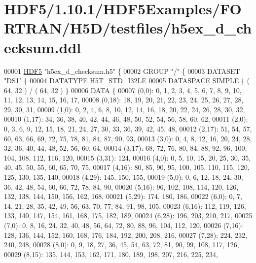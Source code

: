\hypertarget{_h_d_f5_21_810_81_2_h_d_f5_examples_2_f_o_r_t_r_a_n_2_h5_d_2testfiles_2h5ex__d__checksum_8ddl_source}{}\section{H\+D\+F5/1.10.1/\+H\+D\+F5\+Examples/\+F\+O\+R\+T\+R\+A\+N/\+H5\+D/testfiles/h5ex\+\_\+d\+\_\+checksum.ddl}
\label{_h_d_f5_21_810_81_2_h_d_f5_examples_2_f_o_r_t_r_a_n_2_h5_d_2testfiles_2h5ex__d__checksum_8ddl_source}

\begin{DoxyCode}
00001 \hyperlink{namespace_h_d_f5}{HDF5} \textcolor{stringliteral}{"h5ex\_d\_checksum.h5"} \{
00002 GROUP \textcolor{stringliteral}{"/"} \{
00003    DATASET \textcolor{stringliteral}{"DS1"} \{
00004       DATATYPE  H5T\_STD\_I32LE
00005       DATASPACE  SIMPLE \{ ( 64, 32 ) / ( 64, 32 ) \}
00006       DATA \{
00007       (0,0): 0, 1, 2, 3, 4, 5, 6, 7, 8, 9, 10, 11, 12, 13, 14, 15, 16, 17,
00008       (0,18): 18, 19, 20, 21, 22, 23, 24, 25, 26, 27, 28, 29, 30, 31,
00009       (1,0): 0, 2, 4, 6, 8, 10, 12, 14, 16, 18, 20, 22, 24, 26, 28, 30, 32,
00010       (1,17): 34, 36, 38, 40, 42, 44, 46, 48, 50, 52, 54, 56, 58, 60, 62,
00011       (2,0): 0, 3, 6, 9, 12, 15, 18, 21, 24, 27, 30, 33, 36, 39, 42, 45, 48,
00012       (2,17): 51, 54, 57, 60, 63, 66, 69, 72, 75, 78, 81, 84, 87, 90, 93,
00013       (3,0): 0, 4, 8, 12, 16, 20, 24, 28, 32, 36, 40, 44, 48, 52, 56, 60, 64,
00014       (3,17): 68, 72, 76, 80, 84, 88, 92, 96, 100, 104, 108, 112, 116, 120,
00015       (3,31): 124,
00016       (4,0): 0, 5, 10, 15, 20, 25, 30, 35, 40, 45, 50, 55, 60, 65, 70, 75,
00017       (4,16): 80, 85, 90, 95, 100, 105, 110, 115, 120, 125, 130, 135, 140,
00018       (4,29): 145, 150, 155,
00019       (5,0): 0, 6, 12, 18, 24, 30, 36, 42, 48, 54, 60, 66, 72, 78, 84, 90,
00020       (5,16): 96, 102, 108, 114, 120, 126, 132, 138, 144, 150, 156, 162, 168,
00021       (5,29): 174, 180, 186,
00022       (6,0): 0, 7, 14, 21, 28, 35, 42, 49, 56, 63, 70, 77, 84, 91, 98, 105,
00023       (6,16): 112, 119, 126, 133, 140, 147, 154, 161, 168, 175, 182, 189,
00024       (6,28): 196, 203, 210, 217,
00025       (7,0): 0, 8, 16, 24, 32, 40, 48, 56, 64, 72, 80, 88, 96, 104, 112, 120,
00026       (7,16): 128, 136, 144, 152, 160, 168, 176, 184, 192, 200, 208, 216,
00027       (7,28): 224, 232, 240, 248,
00028       (8,0): 0, 9, 18, 27, 36, 45, 54, 63, 72, 81, 90, 99, 108, 117, 126,
00029       (8,15): 135, 144, 153, 162, 171, 180, 189, 198, 207, 216, 225, 234,

\end{DoxyCode}
